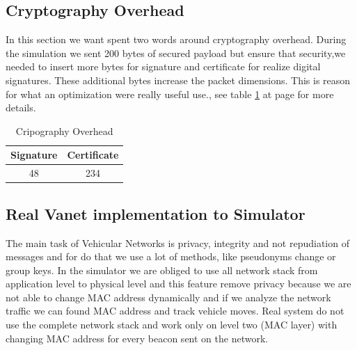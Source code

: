 \subsection{Cryptography Overhead}\label{sec:CryptographyOverhead}
In this section we want spent two words around cryptography overhead. During the simulation we sent 200 bytes of secured payload but ensure that security,we needed to insert more bytes for signature and certificate for realize digital signatures. These additional bytes  increase the packet dimensions. This is reason for what an optimization were really useful use.\cite{calandriello}, see table \ref{tab:CryptographyOverhead} at page \pageref{tab:CryptographyOverhead} for more details.
\begin{table}[!ht]
	\centering
	\caption{Cripography Overhead}
	\begin{tabular}{|c|c|}
	\hline\hline 
	\textbf{Signature} & \textbf{Certificate}\\
	\hline
		48 & 234\\
	\hline
	\hline     %
 	\end{tabular} 
	\label{tab:CryptographyOverhead}
\end{table}
\subsection{Real Vanet implementation to Simulator}
The main task of Vehicular Networks is privacy, integrity and not repudiation of messages and for do that we use a lot of methods, like pseudonyms change or group keys. In the simulator we are obliged to use all network stack from application level to physical level and this feature remove privacy because we are not able to change MAC address dynamically and if we analyze the network traffic we can found MAC address and track vehicle moves. Real system do not use the complete network stack and work only on level two (MAC layer) with changing MAC address for every beacon sent on the network.
